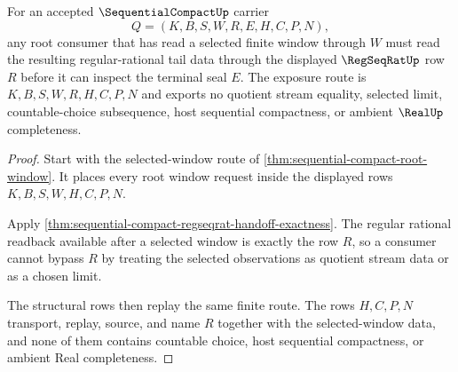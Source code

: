 \begin{theorem}
\label{thm:sequential-compact-root-regseqrat-exposure}
For an accepted $\SequentialCompactUp$ carrier
$$
Q=(K,B,S,W,R,E,H,C,P,N),
$$
any root consumer that has read a selected finite window through $W$ must read the resulting regular-rational tail data through the displayed $\RegSeqRatUp$ row $R$ before it can inspect the terminal seal $E$. The exposure route is $K,B,S,W,R,H,C,P,N$ and exports no quotient stream equality, selected limit, countable-choice subsequence, host sequential compactness, or ambient $\RealUp$ completeness.
\end{theorem}
\begin{proof}
Start with the selected-window route of \autoref{thm:sequential-compact-root-window}. It places every root window request inside the displayed rows $K,B,S,W,H,C,P,N$.

Apply \autoref{thm:sequential-compact-regseqrat-handoff-exactness}. The regular rational readback available after a selected window is exactly the row $R$, so a consumer cannot bypass $R$ by treating the selected observations as quotient stream data or as a chosen limit.

The structural rows then replay the same finite route. The rows $H,C,P,N$ transport, replay, source, and name $R$ together with the selected-window data, and none of them contains countable choice, host sequential compactness, or ambient Real completeness.
\end{proof}

